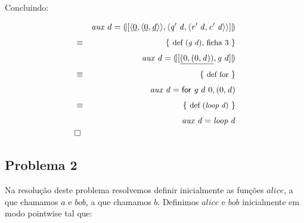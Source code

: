 \documentclass[a4paper]{article}
\newcommand{\Varid}[1]{\mathit{#1}}
\begin{document}
Concluindo:

\begin{eqnarray*}
\start
     \ensuremath{\Varid{aux}\;\Varid{d}\mathrel{=}\cataNat{\alt{\conj{\underline{\mathrm{0}}}{\conj{\underline{\mathrm{0}}}{\underline{\Varid{d}}}}}{\conj{\Varid{q'}\;\Varid{d}}{\conj{\Varid{r'}\;\Varid{d}}{\Varid{c'}\;\Varid{d}}}}}}
%
\just\equiv{def (\ensuremath{\Varid{g}\;\Varid{d}}), ficha 3}
%
     \ensuremath{\Varid{aux}\;\Varid{d}\mathrel{=}\cataNat{\alt{\underline{(\mathrm{0},(\mathrm{0},\Varid{d}))}}{\Varid{g}\;\Varid{d}}}}
%
\just\equiv{def for}
%
     \ensuremath{\Varid{aux}\;\Varid{d}\mathrel{=}\for{\Varid{g}\;\Varid{d}}\ {\mathrm{0},(\mathrm{0},\Varid{d})}}
%
\just\equiv{def (\ensuremath{\Varid{loop}\;\Varid{d}})}
%
     \ensuremath{\Varid{aux}\;\Varid{d}\mathrel{=}\Varid{loop}\;\Varid{d}}
\qed
\end{eqnarray*}

\subsection*{Problema 2}

Na resolução deste problema resolvemos definir inicialmente as funções \ensuremath{\Varid{alice}}, a que chamamos \ensuremath{\Varid{a}} e \ensuremath{\Varid{bob}}, a que chamamos \ensuremath{\Varid{b}}.
Definimos \ensuremath{\Varid{alice}} e \ensuremath{\Varid{bob}} inicialmente em modo pointwise tal que:
\end{document}

